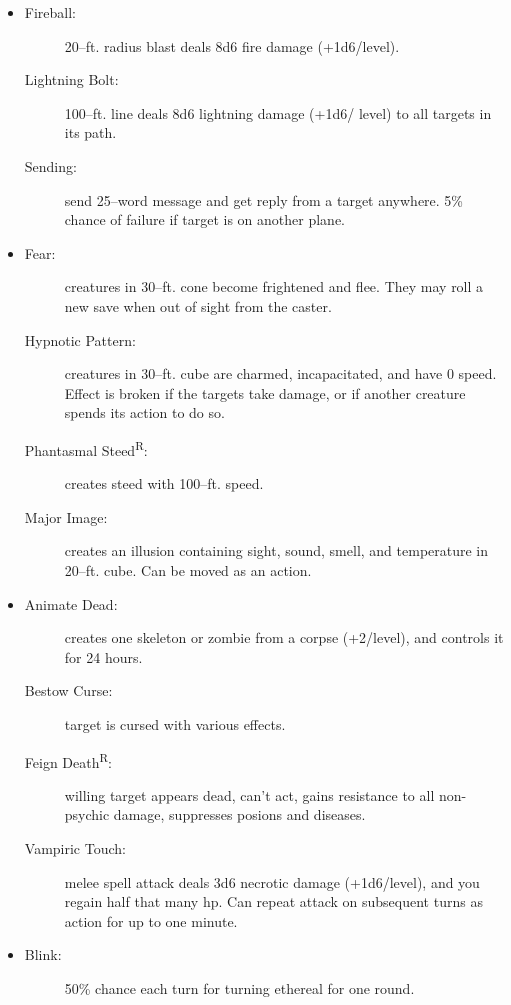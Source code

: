 \documentclass[DIV=14, paper=a4, fontsize=12pt, twocolumn, twoside]{scrartcl}
\begin{document}
\begin{itemize}[align=parleft,labelwidth=1cm]
\begin{description}
\end{description}
\renewcommand{\labelitemi}{Evoc}\item
\begin{description}
 \item[Fireball:] 20–ft. radius blast deals 8d6 fire damage (+1d6/level).
 \item[Lightning Bolt:] 100–ft. line deals 8d6 lightning damage (+1d6/ level) to all targets in its path.
 \item[Sending:] send 25–word message and get reply from a target anywhere. 5\% chance of failure if target is on another plane.
\end{description}
\renewcommand{\labelitemi}{Illus}\item
\begin{description}
 \item[Fear:] creatures in 30–ft. cone become frightened and flee. They may roll a new save when out of sight from the caster.
 \item[Hypnotic Pattern:] creatures in 30–ft. cube are charmed, incapacitated, and have 0 speed. Effect is broken if the targets take damage, or if another creature spends its action to do so.
 \item[Phantasmal Steed\textsuperscript{R}:] creates steed with 100–ft. speed.
 \item[Major Image:] creates an illusion containing sight, sound, smell, and temperature in 20–ft. cube. Can be moved as an action.
\end{description}
\renewcommand{\labelitemi}{Necro}\item
\begin{description}
 \item[Animate Dead:] creates one skeleton or zombie from a corpse (+2/level), and controls it for 24 hours.
 \item[Bestow Curse:] target is cursed with various effects.
 \item[Feign Death\textsuperscript{R}:] willing target appears dead, can’t act, gains resistance to all non-psychic damage, suppresses posions and diseases.
 \item[Vampiric Touch:] melee spell attack deals 3d6 necrotic damage (+1d6/level), and you regain half that many hp. Can repeat attack on subsequent turns as action for up to one minute.
\end{description}
\renewcommand{\labelitemi}{Trans}\item
\begin{description}
 \item[Blink:] 50\% chance each turn for turning ethereal for one round.

\end{description}
\end{itemize}
\end{document}
